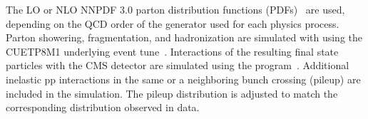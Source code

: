 The LO or NLO NNPDF 3.0 parton distribution functions (PDFs)~\cite{Ball:2014uwa} are 
used, depending on the QCD order of the generator used for each physics 
process. 
%
Parton showering, fragmentation, and hadronization are simulated with {\sc {}} using the CUETP8M1 underlying event tune~\cite{ue1,ue2}. 
%
Interactions of the resulting final state particles with the CMS detector are simulated using the \GEANTfour program~\cite{geant4}.
%
Additional inelastic pp interactions in the same or a neighboring bunch crossing (pileup) are included in the simulation.
%
The pileup distribution is adjusted to match the corresponding distribution observed in data. 

